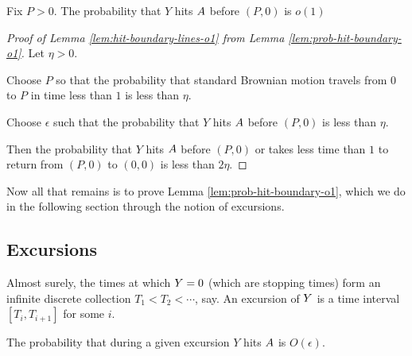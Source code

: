 {\newcommand{\farpoint}{(P,0)}
\newcommand{\probhitboundaryis}[1]{Fix $P > 0$.  The probability that $Y$
  hits $\boundarylines$ before $\farpoint$ is #1}

\begin{lemma}
  \label{lem:prob-hit-boundary-o1}
  \probhitboundaryis{$o(1)$}
\end{lemma}

\newcommand{\origin}{(0,0)}

\begin{proof}[Proof of Lemma \ref{lem:hit-boundary-lines-o1} from
    Lemma \ref{lem:prob-hit-boundary-o1}]
  Let $\eta > 0$.

  Choose $P$ so that the probability that standard Brownian motion
  travels from $0$ to $P$ in time less than $1$ is less than
  $\eta$.

  Choose $\epsilon$ such that the probability that $Y$ hits
  $A$ before $\farpoint$ is less than $\eta$.

  Then the probability that $Y$ hits $A$ before $\farpoint$
  or takes less time than $1$ to return from $\farpoint$ to $\origin$ is
  less than $2\eta$.

\end{proof}

Now all that remains is to prove Lemma \ref{lem:prob-hit-boundary-o1},
which we do in the following section through the notion of excursions.

\subsection{Excursions}

\newcommand{\excursionstart}{T}

\begin{definition*}
  Almost surely, the times at which $Y = 0$ (which are stopping
  times) form an infinite discrete collection $\excursionstart_1 <
  \excursionstart_2 < \cdots$, say.  An excursion of $Y$ is a
  time interval $[\excursionstart_i, \excursionstart_{i+1}]$ for some
  $i$.
\end{definition*}

\newcommand{\Omegaeloge}{\Omega(\epsilon\log\epsilon)}

\newcommand{\probexcursion}[2]{The probability that during a given
  excursion #1 is #2.}

\begin{lemma}
  \label{lem:Phitboundaryline}
  \probexcursion{$Y$ hits $A$}{$O(\epsilon)$}
\end{lemma}

}
